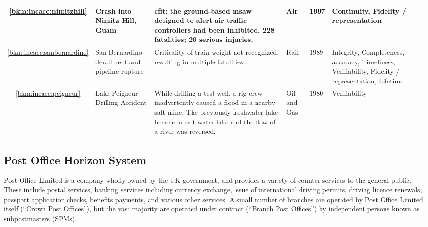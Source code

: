 \begin{longtable}{|C{}|L{}|L{}|L{}|L{}|L{}|}
	\hline
	\ref{bkm:incacc:nimitzhill} & Crash into Nimitz Hill, Guam & \Gls{cfit}; the ground-based \gls{msaw} designed to alert air traffic controllers had been inhibited. 228 fatalities; 26 serious injuries. & Air & 1997 & Continuity, Fidelity / representation \\
	\hline
        \ref{bkm:incacc:sanbernardino} &
        San Bernardino  derailment and pipeline rupture & Criticality of train weight not recognized,
        resulting in multiple fatalities &
        Rail & 1989 & Integrity, Completeness, \gls{accuracy}, Timeliness, Verifiability, Fidelity / representation, Lifetime \\
        \hline
	\ref{bkm:incacc:peigneur} & Lake Peigneur Drilling Accident & While drilling a test well, a rig crew inadvertently caused a flood in a nearby salt mine. The previously freshwater lake became a salt water lake and the flow of a river was reversed. & Oil and Gas & 1980 & Verifiability \\
	\hline

\end{longtable}

\subsection{Post Office Horizon System}\label{bkm:incacc:horizon}
Post Office Limited is a company wholly owned by the UK government, and provides a variety of counter services to the general public. These include postal services, banking services including currency exchange, issue of international driving permits, driving licence renewals, passport application checks, benefits payments, and various other services. A small number of branches are operated by Post Office Limited itself (``Crown Post Offices''), but the vast majority are operated under contract (``Branch Post Offices'') by independent persons known as subpostmasters (SPMs).

